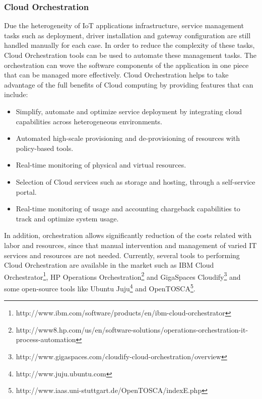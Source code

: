 \subsubsection{Cloud Orchestration}
\label{subs:cloud_orchestration}
Due the heterogeneity of IoT applications infrastructure, service management tasks
such as deployment, driver installation and gateway configuration are still handled
manually for each case. In order to reduce the complexity of these tasks, Cloud Orchestration
tools can be used to automate these management tasks. The orchestration can wove the
software components of the application in one piece that can be managed more effectively.
Cloud Orchestration helps to take advantage of the full benefits of Cloud computing by
providing features that can include:
\begin{itemize}
  \item Simplify, automate and optimize service deployment by integrating cloud capabilities
  across heterogeneous environments.
  \item Automated high-scale provisioning and de-provisioning of resources with policy-based tools.
  \item Real-time monitoring of physical and virtual resources.
  \item Selection of Cloud services such as storage and hosting, through a self-service portal.
  \item Real-time monitoring of usage and accounting chargeback capabilities to track and optimize system usage.
\end{itemize}
In addition, orchestration allows significantly reduction of the costs related with labor
and resources, since that manual intervention and management of varied IT services and resources
are not needed. Currently, several tools to performing Cloud Orchestration are available
in the market such as IBM Cloud Orchestrator\footnote{http://www.ibm.com/software/products/en/ibm-cloud-orchestrator},
HP Operations Orchestration\footnote{http://www8.hp.com/us/en/software-solutions/operations-orchestration-it-process-automation}
and GigaSpaces Cloudify\footnote{http://www.gigaspaces.com/cloudify-cloud-orchestration/overview}
and some open-source tools like Ubuntu Juju\footnote{http://www.juju.ubuntu.com}
and OpenTOSCA\footnote{http://www.iaas.uni-stuttgart.de/OpenTOSCA/indexE.php}.\\
